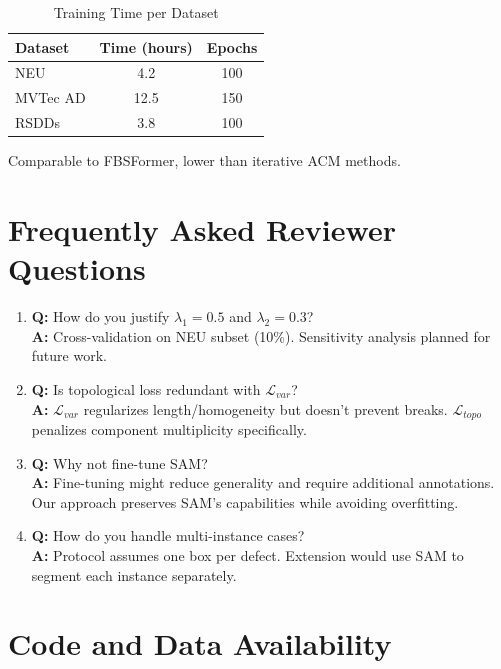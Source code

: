 \documentclass[12pt, a4paper]{article}
\newcommand{\calL}{\mathcal{L}}
\begin{document}
\begin{table}[h]
\centering
\caption{Training Time per Dataset}
\begin{tabular}{lcc}
\toprule
\textbf{Dataset} & \textbf{Time (hours)} & \textbf{Epochs} \\
\midrule
NEU & 4.2 & 100 \\
MVTec AD & 12.5 & 150 \\
RSDDs & 3.8 & 100 \\
\bottomrule
\end{tabular}
\end{table}

Comparable to FBSFormer, lower than iterative ACM methods.

\section{Frequently Asked Reviewer Questions}
\label{app:faq}

\begin{enumerate}
    \item \textbf{Q:} How do you justify $\lambda_1=0.5$ and $\lambda_2=0.3$? \\
    \textbf{A:} Cross-validation on NEU subset (10\%). Sensitivity analysis planned for future work.
    
    \item \textbf{Q:} Is topological loss redundant with $\calL_{var}$? \\
    \textbf{A:} $\calL_{var}$ regularizes length/homogeneity but doesn't prevent breaks. $\calL_{topo}$ penalizes component multiplicity specifically.
    
    \item \textbf{Q:} Why not fine-tune SAM? \\
    \textbf{A:} Fine-tuning might reduce generality and require additional annotations. Our approach preserves SAM's capabilities while avoiding overfitting.
    
    \item \textbf{Q:} How do you handle multi-instance cases? \\
    \textbf{A:} Protocol assumes one box per defect. Extension would use SAM to segment each instance separately.
\end{enumerate}

\section*{Code and Data Availability}
\end{document}
